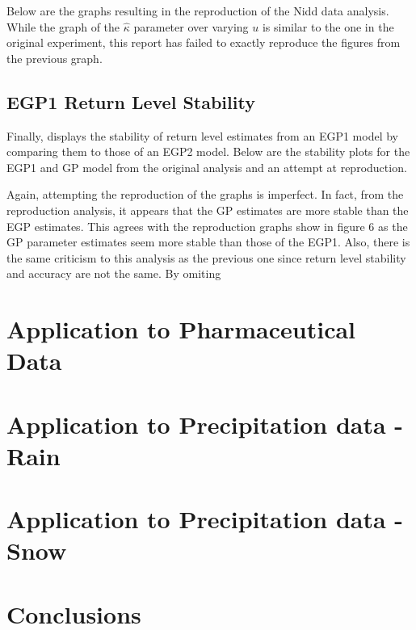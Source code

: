\documentclass[12pt]{article}
\theoremstyle{definition}
\theoremstyle{definition}
\begin{document}
Below are the graphs resulting in the reproduction of the Nidd data analysis. While the graph of the $\hat\kappa$ parameter over varying $u$ is similar to the one in the original experiment, this report has failed to exactly reproduce the figures from the previous graph.



\subsection{EGP1 Return Level Stability}
Finally, \cite{papatawn} displays the stability of return level estimates from an EGP1 model by comparing them to those of an EGP2 model. Below are the stability plots for the EGP1 and GP model from the original analysis and an attempt at reproduction. 

Again, attempting the reproduction of the graphs is imperfect. In fact, from the reproduction analysis, it appears that the GP estimates are more stable than the EGP estimates. This agrees with the reproduction graphs show in figure 6 as the GP parameter estimates seem more stable than those of the EGP1. Also, there is the same criticism to this analysis as the previous one since return level stability and accuracy are not the same. By omiting 

\section{Application to Pharmaceutical Data}


\section{Application to Precipitation data - Rain}


\section{Application to Precipitation data - Snow}


\section{Conclusions}

 
\cite{papatawn}



\end{document}
